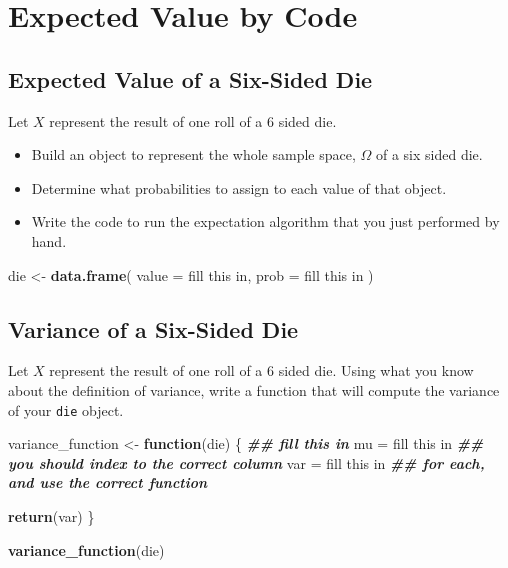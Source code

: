 \documentclass[
]{book}
\newenvironment{Shaded}{\begin{snugshade}}{\end{snugshade}}
\newcommand{\AttributeTok}[1]{\textcolor[rgb]{0.13,0.29,0.53}{#1}}
\newcommand{\ControlFlowTok}[1]{\textcolor[rgb]{0.13,0.29,0.53}{\textbf{#1}}}
\newcommand{\DocumentationTok}[1]{\textcolor[rgb]{0.56,0.35,0.01}{\textbf{\textit{#1}}}}
\newcommand{\FunctionTok}[1]{\textcolor[rgb]{0.13,0.29,0.53}{\textbf{#1}}}
\newcommand{\NormalTok}[1]{#1}
\newcommand{\OtherTok}[1]{\textcolor[rgb]{0.56,0.35,0.01}{#1}}
\newcommand{\StringTok}[1]{\textcolor[rgb]{0.31,0.60,0.02}{#1}}
\providecommand{\tightlist}{%
  \setlength{\itemsep}{0pt}\setlength{\parskip}{0pt}}
\theoremstyle{definition}
\theoremstyle{definition}
\theoremstyle{definition}
\theoremstyle{definition}
\theoremstyle{remark}
\begin{document}
\section{Expected Value by Code}\label{expected-value-by-code}

\subsection{Expected Value of a Six-Sided Die}\label{expected-value-of-a-six-sided-die}

Let \(X\) represent the result of one roll of a 6 sided die.

\begin{itemize}
\tightlist
\item
  Build an object to represent the whole sample space, \(\Omega\) of a six sided die.
\item
  Determine what probabilities to assign to each value of that object.
\item
  Write the code to run the expectation algorithm that you just performed by hand.
\end{itemize}

\begin{Shaded}
\begin{Highlighting}[]
\NormalTok{die }\OtherTok{\textless{}{-}} \FunctionTok{data.frame}\NormalTok{(}
  \AttributeTok{value =} \StringTok{\textquotesingle{}fill this in\textquotesingle{}}\NormalTok{,}
  \AttributeTok{prob  =} \StringTok{\textquotesingle{}fill this in\textquotesingle{}}
\NormalTok{)}
\end{Highlighting}
\end{Shaded}

\subsection{Variance of a Six-Sided Die}\label{variance-of-a-six-sided-die}

Let \(X\) represent the result of one roll of a 6 sided die. Using what you know about the definition of variance, write a function that will compute the variance of your \texttt{die} object.

\begin{Shaded}
\begin{Highlighting}[]
\NormalTok{variance\_function }\OtherTok{\textless{}{-}} \ControlFlowTok{function}\NormalTok{(die) \{ }
  \DocumentationTok{\#\# fill this in}
\NormalTok{  mu }\OtherTok{=} \StringTok{\textquotesingle{}fill this in\textquotesingle{}}   \DocumentationTok{\#\# you should index to the correct column}
\NormalTok{  var }\OtherTok{=} \StringTok{\textquotesingle{}fill this in\textquotesingle{}}  \DocumentationTok{\#\# for each, and use the correct function}
  
  \FunctionTok{return}\NormalTok{(var)}
\NormalTok{\}}

\FunctionTok{variance\_function}\NormalTok{(die)}
\end{Highlighting}
\end{Shaded}
\end{document}
